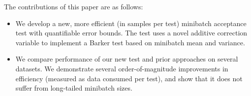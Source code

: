 \documentclass[twoside]{article} \usepackage{aistats2017}
\begin{document}

The contributions of this paper are as follows:

\begin{itemize}[noitemsep]
    \item We develop a new, more efficient (in samples per test) minibatch
    acceptance test with quantifiable error bounds. The test uses a novel
    additive correction variable to implement a Barker test based on minibatch
    mean and variance. 


    \item We compare performance of our new test and prior approaches on several
    datasets. We demonstrate several order-of-magnitude improvements in efficiency
    (measured as data consumed per test), and show that it does not suffer from
    long-tailed minibatch sizes.
\end{itemize}
\end{document}
